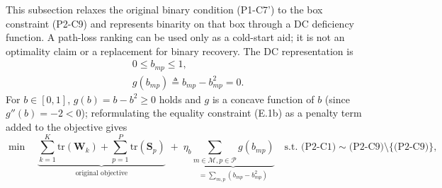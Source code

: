 \documentclass[12pt,a4paper]{article}
\newcommand{\mat}[1]{\mathbf{#1}}
\newcommand{\tr}{\text{tr}}
\begin{document}
This subsection relaxes the original binary condition (P1-C7') to the box constraint (P2-C9) and represents binarity on that box through a DC deficiency function. A path-loss ranking can be used only as a cold-start aid; it is not an optimality claim or a replacement for binary recovery. The DC representation is
\begin{subequations}\label{eq:b-rewrite}
\begin{align}
& 0 \leq b_{mp} \leq 1, \tag{E.1a} \\
& g(b_{mp}) \triangleq b_{mp} - b_{mp}^2 = 0. \tag{E.1b}
\end{align}
\end{subequations}
For $b \in [0,1]$, $g(b) = b - b^2 \geq 0$ holds and $g$ is a concave function of $b$ (since $g''(b) = -2 < 0$); reformulating the equality constraint (E.1b) as a penalty term added to the objective gives
\begin{equation}
\min \quad \underbrace{\sum_{k=1}^K \tr(\mat{W}_k) + \sum_{p=1}^P \tr(\mat{S}_p)}_{\text{original objective}} \; + \; \eta_b \underbrace{\sum_{m \in \mathcal{M}, p \in \mathcal{P}} g(b_{mp})}_{= \sum_{m,p} (b_{mp} - b_{mp}^2)} \quad \text{s.t. (P2-C1)} \sim \text{(P2-C9)} \setminus \{\text{(P2-C9)}\}, \tag{P2-DCP}
\end{equation}
\end{document}
